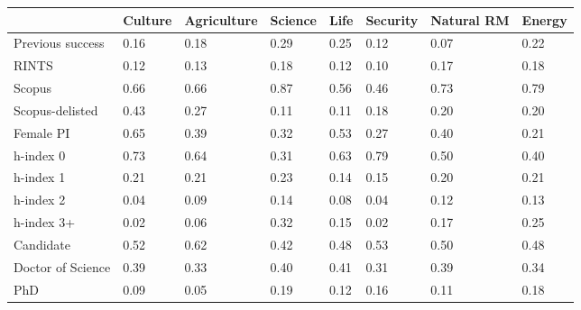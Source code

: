 \begin{table}
\begin{adjustwidth}{-2.25in}{0in}
\centering
\begin{tabular}[t]{llllllll}
\toprule
 & Culture & Agriculture & Science & Life & Security & Natural RM & Energy\\
\midrule
Previous success & 0.16 & 0.18 & 0.29 & 0.25 & 0.12 & 0.07 & 0.22\\
RINTS & 0.12 & 0.13 & 0.18 & 0.12 & 0.10 & 0.17 & 0.18\\
Scopus& 0.66 & 0.66 & 0.87 & 0.56 & 0.46 & 0.73 & 0.79\\
Scopus-delisted & 0.43 & 0.27 & 0.11 & 0.11 & 0.18 & 0.20 & 0.20\\
Female PI & 0.65 & 0.39 & 0.32 & 0.53 & 0.27 & 0.40 & 0.21\\
h-index 0 & 0.73 & 0.64 & 0.31 & 0.63 & 0.79 & 0.50 & 0.40\\
h-index 1 & 0.21 & 0.21 & 0.23 & 0.14 & 0.15 & 0.20 & 0.21\\
h-index 2 & 0.04 & 0.09 & 0.14 & 0.08 & 0.04 & 0.12 & 0.13\\
h-index 3+ & 0.02 & 0.06 & 0.32 & 0.15 & 0.02 & 0.17 & 0.25\\
Candidate & 0.52 & 0.62 & 0.42 & 0.48 & 0.53 & 0.50 & 0.48\\
Doctor of Science  & 0.39 & 0.33 & 0.40 & 0.41 & 0.31 & 0.39 & 0.34\\
PhD & 0.09 & 0.05 & 0.19 & 0.12 & 0.16 & 0.11 & 0.18\\
\bottomrule
\end{tabular}
\end{adjustwidth}
\end{table}